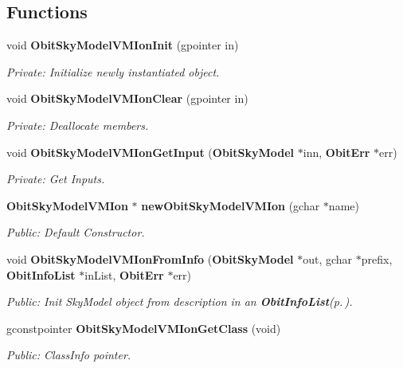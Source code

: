 \subsection*{Functions}
\begin{CompactItemize}
\item 
void {\bf Obit\-Sky\-Model\-VMIon\-Init} (gpointer in)
\begin{CompactList}\small\item\em Private: Initialize newly instantiated object. \item\end{CompactList}\item 
void {\bf Obit\-Sky\-Model\-VMIon\-Clear} (gpointer in)
\begin{CompactList}\small\item\em Private: Deallocate members. \item\end{CompactList}\item 
void {\bf Obit\-Sky\-Model\-VMIon\-Get\-Input} ({\bf Obit\-Sky\-Model} $\ast$inn, {\bf Obit\-Err} $\ast$err)
\begin{CompactList}\small\item\em Private: Get Inputs. \item\end{CompactList}\item 
{\bf Obit\-Sky\-Model\-VMIon} $\ast$ {\bf new\-Obit\-Sky\-Model\-VMIon} (gchar $\ast$name)
\begin{CompactList}\small\item\em Public: Default Constructor. \item\end{CompactList}\item 
void {\bf Obit\-Sky\-Model\-VMIon\-From\-Info} ({\bf Obit\-Sky\-Model} $\ast$out, gchar $\ast$prefix, {\bf Obit\-Info\-List} $\ast$in\-List, {\bf Obit\-Err} $\ast$err)
\begin{CompactList}\small\item\em Public: Init Sky\-Model object from description in an {\bf Obit\-Info\-List}{\rm (p.\,\pageref{structObitInfoList})}. \item\end{CompactList}\item 
gconstpointer {\bf Obit\-Sky\-Model\-VMIon\-Get\-Class} (void)
\begin{CompactList}\small\item\em Public: Class\-Info pointer. \item\end{CompactList}\item 

\end{CompactItemize}
